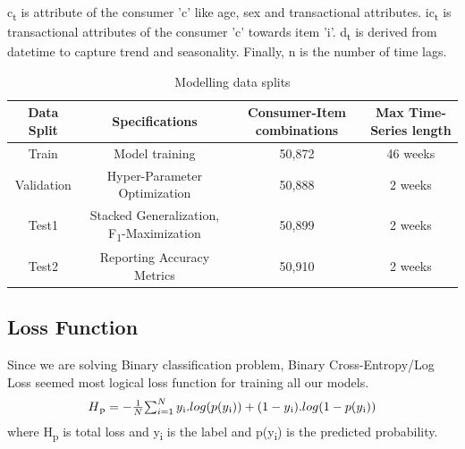 c\textsubscript{t} is attribute of the consumer 'c' like age, sex and transactional attributes. 
ic\textsubscript{t} is transactional attributes of the consumer 'c'  towards item 'i'. 
d\textsubscript{t} is derived from datetime to capture trend and seasonality. 
Finally, n is the number of time lags.
\begin{table}[t]
\caption{Modelling data splits}
\vspace{0.1 in}
\centering
\resizebox{3.3in}{!}
{%
\begin{tabular}{|c|c|c|c|}
\hline
{\bf Data Split} & {\bf Specifications} & {\bf Consumer-Item combinations} & {\bf Max Time-Series length} \\  
\hline\hline
Train  		&  Model training &  50,872 &  46 weeks \\ \hline
Validation	  		&  Hyper-Parameter Optimization &  50,888 &  2 weeks \\ \hline
Test1  		&  Stacked Generalization, F\textsubscript{1}-Maximization & 50,899 &  2 weeks\\ \hline
Test2	  		&  Reporting Accuracy Metrics & 50,910 &  2 weeks\\
\hline
\end{tabular}
}
\label{tab:datasplit}
\end{table}
\subsection{Loss Function}
Since we are solving Binary classification problem, Binary Cross-Entropy/Log Loss seemed most logical loss function 
for training all our models.
  \begin{equation}
      \begin{array}{l}
        H\textsubscript{p} = - \frac{1}{N}$$\sum_{i=1}^{N}y\textsubscript{i}.log(p(y\textsubscript{i}))+
        (1- y\textsubscript{i}).log(1-p(y\textsubscript{i}))
      \end{array}
    \label{eqn:logloss}
  \end{equation}
where H\textsubscript{p} is total loss and y\textsubscript{i} is the label and p(y\textsubscript{i}) is the predicted probability.
